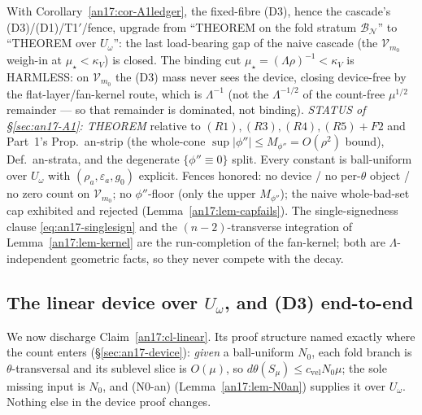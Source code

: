 \begin{remark}\label{an17:rem-A1status}
With Corollary~\ref{an17:cor-A1ledger}, the fixed-fibre (D3), hence the
cascade's (D3)/(D1)/T1$'$/fence, upgrade from ``THEOREM on the fold stratum
$\mathcal B_{\mathcal N}$'' to ``THEOREM over $U_\omega$'': the last load-bearing
gap of the naive cascade (the $\mathcal V_{m_0}$ weigh-in at $\mu_\star<\kappa_V$)
is closed. The binding cut $\mu_\star=(\Lambda\rho)^{-1}<\kappa_V$ is HARMLESS: on
$\mathcal V_{m_0}$ the (D3) mass never sees the device, closing device-free by the
flat-layer/fan-kernel route, which is $\Lambda^{-1}$ (not the $\Lambda^{-1/2}$ of
the count-free $\mu^{1/2}$ remainder --- so that remainder is dominated, not
binding). \emph{STATUS of \S\ref{sec:an17-A1}: {\rm THEOREM}} relative to
$(R1),(R3),(R4),(R5)+F2$ and Part~1's Prop.~an-strip (the whole-cone
$\sup|\phi''|\le M_{\phi''}=O(\rho^2)$ bound), Def.~an-strata, and the degenerate
$\{\phi''\equiv0\}$ split. Every constant is ball-uniform over $U_\omega$ with
$(\rho_a,\varepsilon_a,g_0)$ explicit. Fences honored: no device / no per-$\theta$
object / no zero count on $\mathcal V_{m_0}$; no $\phi''$-floor (only the upper
$M_{\phi''}$); the naive whole-bad-set cap exhibited and rejected
(Lemma~\ref{an17:lem-capfails}). The single-signedness clause
\eqref{eq:an17-singlesign} and the $(n-2)$-transverse integration of
Lemma~\ref{an17:lem-kernel} are the run-completion of the fan-kernel; both are
$\Lambda$-independent geometric facts, so they never compete with the decay.
\end{remark}

\subsection{The linear device over $U_\omega$, and (D3) end-to-end}
\label{sec:an17-cascade}

We now discharge Claim~\ref{an17:cl-linear}. Its proof structure named exactly
where the count enters (\S\ref{sec:an17-device}): \emph{given} a ball-uniform
$N_0$, each fold branch is $\theta$-transversal and its sublevel slice is $O(\mu)$,
so $d\theta(S_\mu)\le c_{\mathrm{vel}}N_0\mu$; the sole missing input is $N_0$, and
(N0-an) (Lemma~\ref{an17:lem-N0an}) supplies it over $U_\omega$. Nothing else in
the device proof changes.

